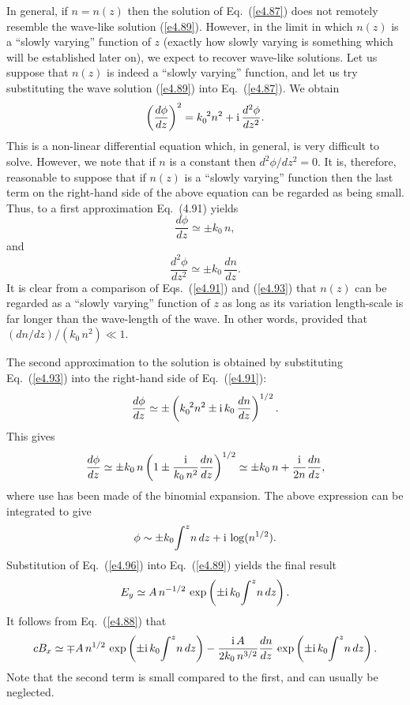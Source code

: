 In general, if $n=n(z)$ then the solution of Eq.~(\ref{e4.87}) does not remotely resemble
the wave-like solution (\ref{e4.89}). However, in the limit in which $n(z)$ is
a ``slowly varying'' function of $z$ (exactly how slowly varying is something which
will be established later on), we   expect to recover wave-like solutions.
Let us suppose that $n(z)$ is indeed a ``slowly varying'' function, and let us try
substituting the wave solution (\ref{e4.89}) into Eq.~(\ref{e4.87}). We obtain
\begin{equation}\label{e4.91}
\left(\frac{d\phi}{dz}\right)^2 = k_0^{~2} n^2 +{\rm i}\,\frac{d^2\phi}
{dz^2}.
\end{equation}
This is a non-linear differential equation which, in general, is very difficult
to solve. However, we note that if $n$ is a constant then $d^2\phi/dz^2=0$.
It is, therefore, reasonable to suppose that if $n(z)$ is a ``slowly varying'' function
then the last term on the right-hand side of the above equation can be
regarded as being small. Thus, to a first approximation Eq.~(4.91) yields
\begin{equation}
\frac{d\phi}{dz} \simeq \pm k_0\,n,
\end{equation}
and
\begin{equation}\label{e4.93}
\frac{d^2 \phi}{dz^2} \simeq \pm k_0\,\frac{dn}{dz}.
\end{equation}
It is clear from a comparison of Eqs.~(\ref{e4.91}) and (\ref{e4.93}) that $n(z)$ can
be regarded as a ``slowly varying'' function of $z$ as long as its variation
length-scale  is far longer than the wave-length of the wave. 
In other words, provided that $(dn/dz)/(k_0\,n^2)\ll 1$. 

The second approximation to the solution  is obtained  by substituting Eq.~(\ref{e4.93}) into
the right-hand side of Eq.~(\ref{e4.91}):
\begin{equation}
\frac{d\phi}{dz} \simeq \pm \left(k_0^{~2} n^2 \pm {\rm i} \,k_0 \,\frac{dn}{dz}\right)^{1/2}.
\end{equation}
This gives
\begin{equation}
\frac{d\phi}{dz} \simeq \pm k_0\,n\left(1\pm \frac{{\rm i}}{k_0 \,n^2}\frac{dn}{dz}
\right)^{1/2}\simeq \pm k_0\,n + \frac{\rm i}{2n}\frac{dn}{dz},
\end{equation}
where use has been made of the binomial expansion. The above expression can be integrated
to give
\begin{equation}\label{e4.96}
\phi \sim \pm k_0\! \int^z \!n\,dz +{\rm i}\,\log(n^{1/2}).
\end{equation}
Substitution of Eq.~(\ref{e4.96}) into Eq.~(\ref{e4.89}) yields the final result
\begin{equation}\label{e4.97}
E_y \simeq A\,n^{-1/2}\,\exp\left(\pm {\rm i}\, k_0\! \int^z \!n\,dz\right).
\end{equation}
It follows from Eq.~(\ref{e4.88}) that
\begin{equation}
cB_x\simeq \mp A\, n^{1/2}\,\exp\left(\pm {\rm i}\,k_0 \!\int^z\! n\,dz\right) -
\frac{ {\rm i}\, A}{2k_0\,n^{3/2}} \frac{dn}
{dz}\,\exp\left(\pm {\rm i}\,k_0 \!\int^z \!n\,dz\right).
\end{equation}
Note that the second term is small compared to the first,  and can usually be neglected.

